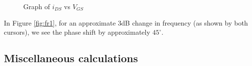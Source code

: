 \documentclass{report}[12pt]
\begin{document}
\begin{figure}[ht]
    \centering
    \caption{Graph of $i_{DS}$ vs $V_{GS}$}
    \label{fig:i_vs_vgs}
\end{figure}

In Figure \hyperref[fig:fr1]{\ref{fig:fr1}}, for an approximate 3dB change in frequency (as shown by both cursors), we see the phase shift by approximately $45^{\circ}$.

\newpage
\subsection*{Miscellaneous calculations}
\end{document}
